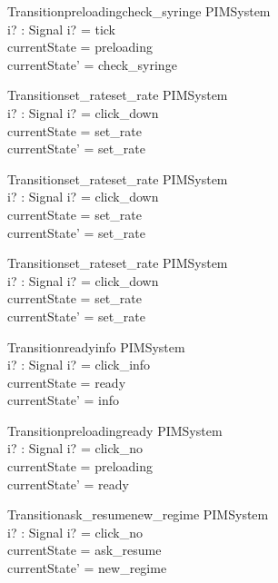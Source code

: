 \begin{schema}{Transitionpreloadingcheck\_syringe}
  \Delta PIMSystem\\
  i? : Signal
\where
  i? = tick \\
  currentState = preloading \\
  currentState' = check\_syringe
\end{schema}

\begin{schema}{Transitionset\_rateset\_rate}
  \Delta PIMSystem\\
  i? : Signal
\where
  i? = click\_down \\
  currentState = set\_rate \\
  currentState' = set\_rate
\end{schema}

\begin{schema}{Transitionset\_rateset\_rate}
  \Delta PIMSystem\\
  i? : Signal
\where
  i? = click\_down \\
  currentState = set\_rate \\
  currentState' = set\_rate
\end{schema}

\begin{schema}{Transitionset\_rateset\_rate}
  \Delta PIMSystem\\
  i? : Signal
\where
  i? = click\_down \\
  currentState = set\_rate \\
  currentState' = set\_rate
\end{schema}

\begin{schema}{Transitionreadyinfo}
  \Delta PIMSystem\\
  i? : Signal
\where
  i? = click\_info \\
  currentState = ready \\
  currentState' = info
\end{schema}

\begin{schema}{Transitionpreloadingready}
  \Delta PIMSystem\\
  i? : Signal
\where
  i? = click\_no \\
  currentState = preloading \\
  currentState' = ready
\end{schema}

\begin{schema}{Transitionask\_resumenew\_regime}
  \Delta PIMSystem\\
  i? : Signal
\where
  i? = click\_no \\
  currentState = ask\_resume \\
  currentState' = new\_regime
\end{schema}

